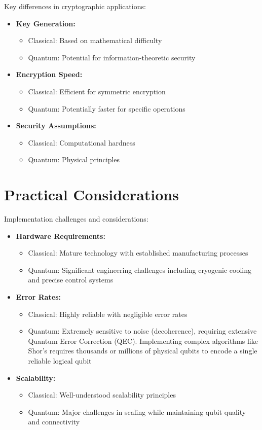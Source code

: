 Key differences in cryptographic applications:
\begin{itemize}
    \item \textbf{Key Generation:}
    \begin{itemize}
        \item Classical: Based on mathematical difficulty
        \item Quantum: Potential for information-theoretic security
    \end{itemize}
    \item \textbf{Encryption Speed:}
    \begin{itemize}
        \item Classical: Efficient for symmetric encryption
        \item Quantum: Potentially faster for specific operations
    \end{itemize}
    \item \textbf{Security Assumptions:}
    \begin{itemize}
        \item Classical: Computational hardness
        \item Quantum: Physical principles
    \end{itemize}
\end{itemize}

\section{Practical Considerations}\label{sec:practical_ch4}

Implementation challenges and considerations:

\begin{itemize}
    \item \textbf{Hardware Requirements:}
    \begin{itemize}
        \item Classical: Mature technology with established manufacturing processes
        \item Quantum: Significant engineering challenges including cryogenic cooling and precise control systems
    \end{itemize}
    \item \textbf{Error Rates:}
    \begin{itemize}
        \item Classical: Highly reliable with negligible error rates
        \item Quantum: Extremely sensitive to noise (decoherence), requiring extensive Quantum Error Correction (QEC). Implementing complex algorithms like Shor's requires thousands or millions of physical qubits to encode a single reliable logical qubit
    \end{itemize}
    \item \textbf{Scalability:}
    \begin{itemize}
        \item Classical: Well-understood scalability principles
        \item Quantum: Major challenges in scaling while maintaining qubit quality and connectivity
    \end{itemize}
\end{itemize}

